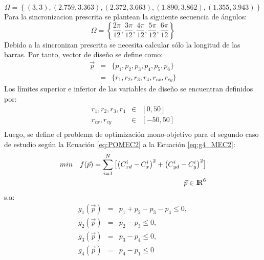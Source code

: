 \begin{equation}\label{eq:Puntos de Presicion MEC2}
\Omega = \left \{ (3, 3), (2.759, 3.363), (2.372, 3.663), (1.890, 3.862), (1.355, 3.943)\right\} 
\end{equation}
Para la sincronizacion prescrita se plantean la siguiente secuencia de ángulos:
\begin{equation}\label{eq:Angulos MEC2}
\Omega = \left \{ \frac{2\pi}{12},\frac{3\pi}{12},\frac{4\pi}{12},\frac{5\pi}{12},\frac{6\pi}{12}\right\} 
\end{equation}
Debido a la sincronizan prescrita se necesita calcular sólo la longitud de las barras. Por tanto, vector de diseño se define como:
\begin{eqnarray}\label{eq:Vector variables MEC1}
\vec{p} &=& \{p_1,p_2,p_3,p_{4},p_{5},p_{6} \}\\
       &=& \{ r_1,r_2,r_3,r_4,r_{cx},r_{cy} \} 
\end{eqnarray}
Los límites superior e inferior de las variables de diseño se encuentran definidos
por:
\begin{eqnarray}\label{eq:limites variables MEC1}
r_1,r_2,r_3,r_4& \in & \left[ 0,50\right] \\
r_{cx},r_{cy} & \in & \left[ -50,50\right] \\
\end{eqnarray}
Luego, se define el problema de optimización mono-objetivo para el segundo caso de estudio según la Ecuación \ref{eq:POMEC2} a la Ecuación \ref{eq:g4_MEC2}:
\begin{equation}\label{eq:POMEC2}
 \begin{aligned}
min\quad  f(\vec{p})=
\sum_{i=1}^{N}\big[\big(C^{i}_{xd}-C^{i}_{x} \big)^2 +\big(C^{i}_{yd}-C^{i}_{y} \big)^2\big]
\\
\vec{p} \in  {\rm I\!R}^{6}
\\
\end{aligned}
\end{equation}
s.a:
\begin{eqnarray}\label{eq:Restricciones MEC2}
g_{1}(\vec{p})&=&p_{1}+ p_{2}-p_{3}-p_{4} \leq 0,\\
g_{2}(\vec{p})&=&p_{2}-p_{3} \leq 0,\\
g_{3}(\vec{p})&=&p_{3}-p_{4} \leq 0,\\
g_{4}(\vec{p})&=&p_{4}-p_{1} \leq 0 \label{eq:g4_MEC2}
\end{eqnarray}


